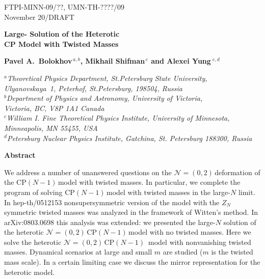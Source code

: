 \documentclass[epsfig,12pt]{article}
\newcommand{\nzt}{${\mathcal N}=(0,2)\,$}
\newcommand{\cpn}{CP$(N-1)\,$}
\begin{document}


\begin{titlepage}

\begin{flushright}
FTPI-MINN-09/??, UMN-TH-????/09\\
November 20/DRAFT
\end{flushright}

\vspace{1cm}

\begin{center}
{  \Large \bf  Large- Solution of the Heterotic\\[2mm]
 CP Model with Twisted Masses}
\end{center}



\vspace{1mm}

\begin{center}

 {\large
 \bf   Pavel A.~Bolokhov$^{\,a,b}$,  Mikhail Shifman$^{\,c}$ and \bf Alexei Yung$^{\,\,c,d}$}
\end {center}

\begin{center}

$^a${\it Theoretical Physics Department, St.Petersburg State University, Ulyanovskaya~1, 
	 Peterhof, St.Petersburg, 198504, Russia}\\
$^b${\it Department of Physics and Astronomy, University of Victoria,\\
    Victoria, BC, V8P 1A1 Canada}\\
$^c${\it  William I. Fine Theoretical Physics Institute,
University of Minnesota,
Minneapolis, MN 55455, USA}\\
$^{d}${\it Petersburg Nuclear Physics Institute, Gatchina, St. Petersburg
188300, Russia
}
\end{center}


\begin{center}
{\large\bf Abstract}
\end{center}
We address a number of unanswered questions on the \nzt deformation of the \cpn model with
twisted masses.  In particular, we
complete the program of solving \cpn model with twisted masses in the large-$N$
limit. In hep-th/0512153 nonsupersymmetric version of the model with the $Z_N$
symmetric twisted masses was analyzed in the framework of Witten's method. In arXiv:0803.0698 
this analysis was extended: we presented the 
large-$N$ solution of the heterotic \nzt \cpn model with no twisted masses.
Here we solve the heterotic \nzt \mbox{\cpn}  model with nonvanishing twisted
masses. Dynamical scenarios at large and small $m$ are studied
($m$ is the twisted mass scale).
In a certain limiting case we discuss the mirror representation for the heterotic model.

\vspace{2cm}




\end{titlepage}
\end{document}
